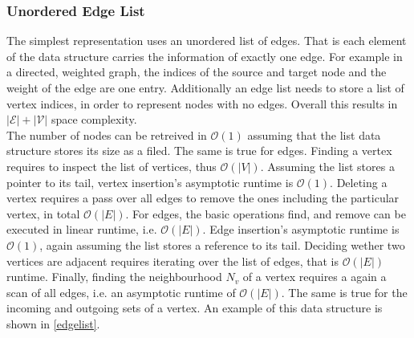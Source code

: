         \subsubsection*{Unordered Edge List}
        The simplest representation uses an unordered list of edges. 
        That is each element of the data structure carries the information of exactly one edge. 
        For example in a directed, weighted graph, the indices of the source and target node and the weight of the edge are one entry. 
        Additionally an edge list needs to store a list of vertex indices, in order to represent nodes with no edges.
        Overall this results in $\mathcal{|E| + |V|}$ space complexity. \\
        
        The number of nodes can be retreived in $\mathcal{O}(1)$ assuming that the list data structure stores its size as a filed. 
        The same is true for edges.
        Finding a vertex requires to inspect the list of vertices, thus $\mathcal{O}(|V|)$. 
        Assuming the list stores a pointer to its tail, vertex insertion's asymptotic runtime is $\mathcal{O}(1)$. 
        Deleting a vertex requires a pass over all edges to remove the ones including the particular vertex, in total $\mathcal{O}(|E|)$.
        For edges, the basic operations find, and remove can be executed in linear runtime, i.e. $\mathcal{O}(|E|)$.
        Edge insertion's asymptotic runtime is $\mathcal{O}(1)$, again assuming the list stores a reference to its tail. 
        Deciding wether two vertices are adjacent requires iterating over the list of edges, that is 
        $\mathcal{O}(|E|)$ runtime.
        Finally, finding the neighbourhood $N_v$ of a vertex requires a again a scan of all edges, i.e. an asymptotic runtime of $\mathcal{O}(|E|)$. 
        The same is true for the incoming and outgoing sets of a vertex.
        An example of this data structure is shown in \ref{edgelist}.
        
